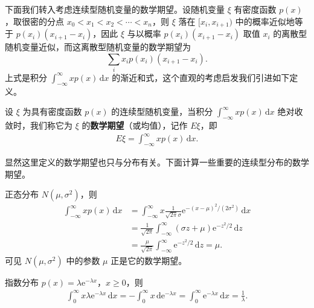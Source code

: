 \documentclass[../../main.tex]{subfiles}
\begin{document}
下面我们转入考虑连续型随机变量的数学期望。设随机变量 $\xi$ 有密度函数 $p(x)$，取很密的分点 $x_0<x_1<x_2<\cdots<x_n$，则 $\xi$ 落在 $[x_i,x_{i+1})$ 中的概率近似地等于 $p(x_i)(x_{i+1}-x_i)$，因此 $\xi$ 与以概率 $p(x_i)(x_{i+1}-x_i)$ 取值 $x_i$ 的离散型随机变量近似，而这离散型随机变量的数学期望为
\[
\sum_i x_i p(x_i)(x_{i+1}-x_i).
\]
上式是积分 $\int_{-\infty}^{\infty} xp(x)\,\mathrm{d}x$ 的渐近和式，这个直观的考虑启发我们引进如下定义。

\begin{definition}[连续型随机变量的数学期望]\label{definition:ch04-连续型期望}
设 $\xi$ 为具有密度函数 $p(x)$ 的连续型随机变量，当积分 $\int_{-\infty}^{\infty} xp(x)\,\mathrm{d}x$ 绝对收敛时，我们称它为 $\xi$ 的\textbf{数学期望}（或均值），记作 $E\xi$，即
\begin{align}
E\xi=\int_{-\infty}^{\infty} xp(x)\,\mathrm{d}x.\label{align:ch04-连续期望}
\end{align}
\end{definition}

显然这里定义的数学期望也只与分布有关。下面计算一些重要的连续型分布的数学期望。

\begin{example}[正态分布的期望]\label{example:ch04-期望-正态}
正态分布 $N(\mu,\sigma^2)$，则
\begin{align}
\int_{-\infty}^{\infty} xp(x)\,\mathrm{d}x
&=\int_{-\infty}^{\infty} x\frac{1}{\sqrt{2\pi}\sigma}\mathrm{e}^{-(x-\mu)^2/(2\sigma^2)}\,\mathrm{d}x\nonumber\\
&=\frac{1}{\sqrt{2\pi}}\int_{-\infty}^{\infty}(\sigma z+\mu)\mathrm{e}^{-z^2/2}\,\mathrm{d}z\nonumber\\
&=\frac{\mu}{\sqrt{2\pi}}\int_{-\infty}^{\infty}\mathrm{e}^{-z^2/2}\,\mathrm{d}z=\mu.\label{align:ch04-正态期望}
\end{align}
可见 $N(\mu,\sigma^2)$ 中的参数 $\mu$ 正是它的数学期望。
\end{example}

\begin{example}[指数分布的期望]\label{example:ch04-期望-指数}
指数分布 $p(x)=\lambda\mathrm{e}^{-\lambda x}$，$x\geqslant 0$，则
\begin{align}
\int_0^{\infty} x\lambda\mathrm{e}^{-\lambda x}\,\mathrm{d}x
=-\int_0^{\infty} x\,\mathrm{d}\mathrm{e}^{-\lambda x}
=\int_0^{\infty}\mathrm{e}^{-\lambda x}\,\mathrm{d}x=\frac{1}{\lambda}.\label{align:ch04-指数期望}
\end{align}
\end{example}
\end{document}
